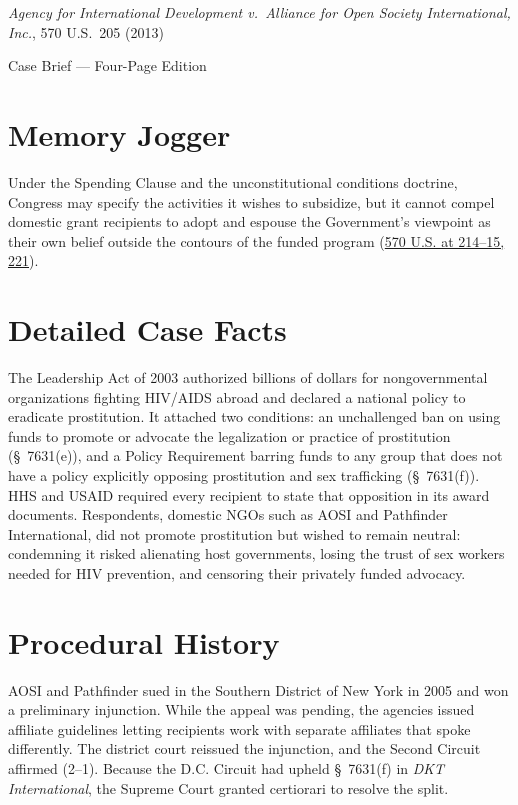 \documentclass[12pt]{article}
\begin{document}
\begin{center}
{\LARGE \textit{Agency for International Development v.\ Alliance for Open Society International, Inc.}, 570 U.S.\ 205 (2013)\par}
\vspace{0.8em}
{\large Case Brief --- Four-Page Edition\par}
\end{center}
\vspace{1em}

\section{Memory Jogger}

Under the Spending Clause and the unconstitutional conditions doctrine, Congress may specify the activities it wishes to subsidize, but it cannot compel domestic grant recipients to adopt and espouse the Government's viewpoint as their own belief outside the contours of the funded program (\href{https://supreme.justia.com/cases/federal/us/570/205/}{570 U.S. at 214--15, 221}).

\section{Detailed Case Facts}

The Leadership Act of 2003 authorized billions of dollars for nongovernmental organizations fighting HIV/AIDS abroad and declared a national policy to eradicate prostitution. It attached two conditions: an unchallenged ban on using funds to promote or advocate the legalization or practice of prostitution (\S~7631(e)), and a Policy Requirement barring funds to any group that does not have a policy explicitly opposing prostitution and sex trafficking (\S~7631(f)). HHS and USAID required every recipient to state that opposition in its award documents. Respondents, domestic NGOs such as AOSI and Pathfinder International, did not promote prostitution but wished to remain neutral: condemning it risked alienating host governments, losing the trust of sex workers needed for HIV prevention, and censoring their privately funded advocacy.

\section{Procedural History}

AOSI and Pathfinder sued in the Southern District of New York in 2005 and won a preliminary injunction. While the appeal was pending, the agencies issued affiliate guidelines letting recipients work with separate affiliates that spoke differently. The district court reissued the injunction, and the Second Circuit affirmed (2--1). Because the D.C. Circuit had upheld \S~7631(f) in \textit{DKT International}, the Supreme Court granted certiorari to resolve the split.
\end{document}
